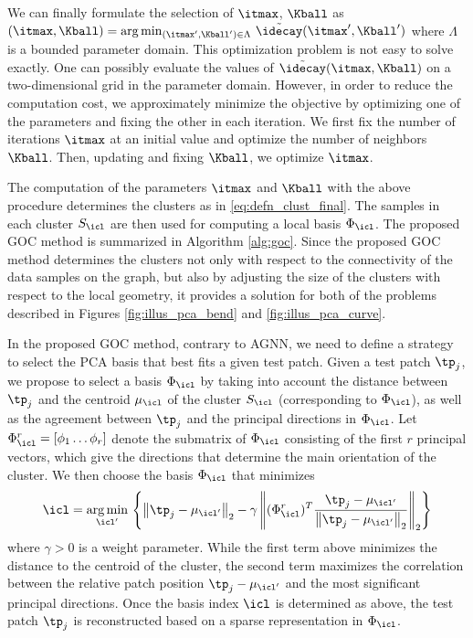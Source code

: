 \documentclass[journal]{IEEEtran}
\begin{document}
We can finally formulate the selection of $\itmax$, $\Kball $  as
$
 (\itmax, \Kball) = \arg\min_{(\itmax', \Kball') \in \Lambda}
  \,\tilde \idecay(\itmax', \Kball')
$
where $\Lambda$ is a bounded parameter domain. This optimization problem is not easy to solve exactly. One can possibly evaluate the values of $\tilde \idecay(\itmax, \Kball)$ on a two-dimensional grid in the parameter domain. However, in order to reduce the computation cost, we approximately minimize the objective by optimizing one of the parameters and fixing the other in each iteration. We first fix the number of iterations $\itmax$ at an initial value and optimize the number of neighbors $\Kball$. Then, updating and fixing $\Kball$, we optimize $\itmax$. 

The computation of the parameters $\itmax$ and $\Kball$ with the above procedure determines the clusters as in \eqref{eq:defn_clust_final}. The samples in each cluster $ S_\icl $ are then used for computing a local basis $\Phi_\icl$. The proposed GOC method is summarized in Algorithm \ref{alg:goc}. Since the proposed GOC method determines the clusters not only with respect to the connectivity of the data samples on the graph, but also by adjusting the size of the clusters with respect to the local geometry, it provides a solution for both of the problems described in Figures \ref{fig:illus_pca_bend} and \ref{fig:illus_pca_curve}. 






In the proposed GOC method, contrary to AGNN, we need to define a strategy to select the PCA basis that best fits a given test patch. Given a test patch $\tp_j$, we propose to select a basis $\Phi_\icl$ by taking into account the distance between $\tp_j$ and the centroid $\mu_\icl$ of the cluster $S_\icl$ (corresponding to $\Phi_\icl$), as well as the agreement between $\tp_j$ and the principal directions in $\Phi_\icl$. Let $\Phi_\icl^r = [\phi_1 \dots \phi_r]$ denote the submatrix of $\Phi_\icl$ consisting of the first $r$ principal vectors, which give the directions that determine the main orientation of the cluster. We then choose the basis $\Phi_\icl$ that minimizes 
\begin{equation}
	\label{eqn:selectD}
	\icl=\underset{\icl'}{\operatorname{arg\,min}} \, \left\{ \left\| \tp_j -\mu_{\icl'}  \right\|_2-\gamma \left\| (\Phi_\icl^r )^T \frac{ \tp_j-\mu_{\icl'}}{\left\| \tp_j -  \mu_{\icl'} \right\|_2}\right\|_2\right\}
\end{equation}
where $\gamma>0$ is a weight parameter. While the first term above minimizes the distance to the centroid of the cluster, the second term maximizes the correlation between the relative patch position $\tp_j-\mu_{\icl'}$  and the most significant principal directions. Once the basis index $\icl$ is determined as above, the test patch $\tp_j$ is reconstructed based on a sparse representation in $\Phi_\icl$.
\end{document}
